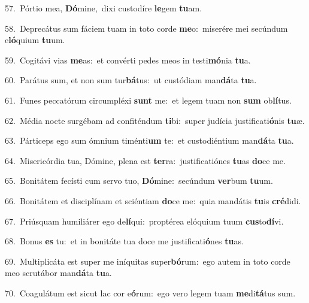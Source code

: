 {\numbfont\textcolor{\numbcolor}{57.}}~Pórtio mea, \textbf{Dó}\-mine,~\star dixi custodíre \textbf{le}\-gem \textbf{tu}\-am.\par
{\numbfont\textcolor{\numbcolor}{58.}}~Deprecátus sum fáciem tuam in toto corde \textbf{me}\-o:~\star miserére mei secúndum e\-\textbf{ló}\-quium \textbf{tu}\-um.\par
{\numbfont\textcolor{\numbcolor}{59.}}~Cogitávi vias \textbf{me}\-as:~\star et convérti pedes meos in testi\-\textbf{mó}\-nia \textbf{tu}\-a.\par
{\numbfont\textcolor{\numbcolor}{60.}}~Parátus sum, et non sum tur\-\textbf{bá}\-tus:~\star ut custódiam man\-\textbf{dá}\-ta \textbf{tu}\-a.\par
{\numbfont\textcolor{\numbcolor}{61.}}~Funes peccatórum circumpléxi \textbf{sunt} me:~\star et legem tuam non \textbf{sum} ob\-\textbf{lí}\-tus.\par
{\numbfont\textcolor{\numbcolor}{62.}}~Média nocte surgébam ad confiténdum \textbf{ti}\-bi:~\star super judícia justificati\-\textbf{ó}\-nis \textbf{tu}\-æ.\par
{\numbfont\textcolor{\numbcolor}{63.}}~Párticeps ego sum ómnium timénti\textbf{um} te:~\star et custodiéntium man\-\textbf{dá}\-ta \textbf{tu}\-a.\par
{\numbfont\textcolor{\numbcolor}{64.}}~Misericórdia tua, Dómine, plena est \textbf{ter}\-ra:~\star justificatiónes \textbf{tu}\-as \textbf{do}\-ce me.\par
{\numbfont\textcolor{\numbcolor}{65.}}~Bonitátem fecísti cum servo tuo, \textbf{Dó}\-mine:~\star secúndum \textbf{ver}\-bum \textbf{tu}\-um.\par
{\numbfont\textcolor{\numbcolor}{66.}}~Bonitátem et disciplínam et sciéntiam \textbf{do}\-ce me:~\star quia mandátis \textbf{tu}\-is \textbf{cré}\-didi.\par
{\numbfont\textcolor{\numbcolor}{67.}}~Priúsquam humiliárer ego de\-\textbf{lí}\-qui:~\star proptérea elóquium tuum \textbf{cus}\-to\-\textbf{dí}\-vi.\par
{\numbfont\textcolor{\numbcolor}{68.}}~Bonus \textbf{es} tu:~\star et in bonitáte tua doce me justificati\-\textbf{ó}\-nes \textbf{tu}\-as.\par
{\numbfont\textcolor{\numbcolor}{69.}}~Multiplicáta est super me iníquitas super\-\textbf{bó}\-rum:~\star ego autem in toto corde meo scrutábor man\-\textbf{dá}\-ta \textbf{tu}\-a.\par
{\numbfont\textcolor{\numbcolor}{70.}}~Coagulátum est sicut lac cor e\-\textbf{ó}\-rum:~\star ego vero legem tuam \textbf{me}\-di\-\textbf{tá}\-tus sum.\par
